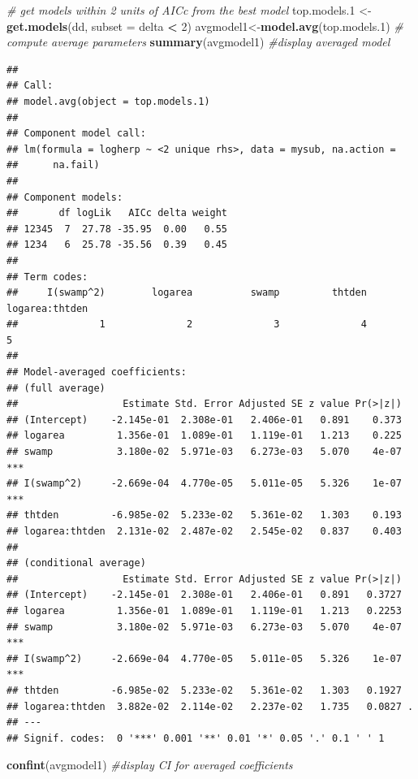 \documentclass[12pt,]{book}
\newenvironment{Shaded}{\begin{snugshade}}{\end{snugshade}}
\newcommand{\CommentTok}[1]{\textcolor[rgb]{0.56,0.35,0.01}{\textit{#1}}}
\newcommand{\DataTypeTok}[1]{\textcolor[rgb]{0.13,0.29,0.53}{#1}}
\newcommand{\DecValTok}[1]{\textcolor[rgb]{0.00,0.00,0.81}{#1}}
\newcommand{\FloatTok}[1]{\textcolor[rgb]{0.00,0.00,0.81}{#1}}
\newcommand{\KeywordTok}[1]{\textcolor[rgb]{0.13,0.29,0.53}{\textbf{#1}}}
\newcommand{\NormalTok}[1]{#1}
\newcommand{\OperatorTok}[1]{\textcolor[rgb]{0.81,0.36,0.00}{\textbf{#1}}}
\newcommand{\StringTok}[1]{\textcolor[rgb]{0.31,0.60,0.02}{#1}}
\begin{document}
\begin{Shaded}
\begin{Highlighting}[]
\CommentTok{# get models within 2 units of AICc from the best model}
\NormalTok{top.models}\FloatTok{.1}\NormalTok{ <-}\StringTok{ }\KeywordTok{get.models}\NormalTok{(dd, }\DataTypeTok{subset =}\NormalTok{ delta }\OperatorTok{<}\StringTok{ }\DecValTok{2}\NormalTok{)}
\NormalTok{avgmodel1<-}\KeywordTok{model.avg}\NormalTok{(top.models}\FloatTok{.1}\NormalTok{) }\CommentTok{# compute average parameters}
\KeywordTok{summary}\NormalTok{(avgmodel1) }\CommentTok{#display averaged model}
\end{Highlighting}
\end{Shaded}

\begin{verbatim}
## 
## Call:
## model.avg(object = top.models.1)
## 
## Component model call: 
## lm(formula = logherp ~ <2 unique rhs>, data = mysub, na.action = 
##      na.fail)
## 
## Component models: 
##       df logLik   AICc delta weight
## 12345  7  27.78 -35.95  0.00   0.55
## 1234   6  25.78 -35.56  0.39   0.45
## 
## Term codes: 
##     I(swamp^2)        logarea          swamp         thtden logarea:thtden 
##              1              2              3              4              5 
## 
## Model-averaged coefficients:  
## (full average) 
##                  Estimate Std. Error Adjusted SE z value Pr(>|z|)    
## (Intercept)    -2.145e-01  2.308e-01   2.406e-01   0.891    0.373    
## logarea         1.356e-01  1.089e-01   1.119e-01   1.213    0.225    
## swamp           3.180e-02  5.971e-03   6.273e-03   5.070    4e-07 ***
## I(swamp^2)     -2.669e-04  4.770e-05   5.011e-05   5.326    1e-07 ***
## thtden         -6.985e-02  5.233e-02   5.361e-02   1.303    0.193    
## logarea:thtden  2.131e-02  2.487e-02   2.545e-02   0.837    0.403    
##  
## (conditional average) 
##                  Estimate Std. Error Adjusted SE z value Pr(>|z|)    
## (Intercept)    -2.145e-01  2.308e-01   2.406e-01   0.891   0.3727    
## logarea         1.356e-01  1.089e-01   1.119e-01   1.213   0.2253    
## swamp           3.180e-02  5.971e-03   6.273e-03   5.070    4e-07 ***
## I(swamp^2)     -2.669e-04  4.770e-05   5.011e-05   5.326    1e-07 ***
## thtden         -6.985e-02  5.233e-02   5.361e-02   1.303   0.1927    
## logarea:thtden  3.882e-02  2.114e-02   2.237e-02   1.735   0.0827 .  
## ---
## Signif. codes:  0 '***' 0.001 '**' 0.01 '*' 0.05 '.' 0.1 ' ' 1
\end{verbatim}

\begin{Shaded}
\begin{Highlighting}[]
\KeywordTok{confint}\NormalTok{(avgmodel1) }\CommentTok{#display CI for averaged coefficients}
\end{Highlighting}
\end{Shaded}
\end{document}
